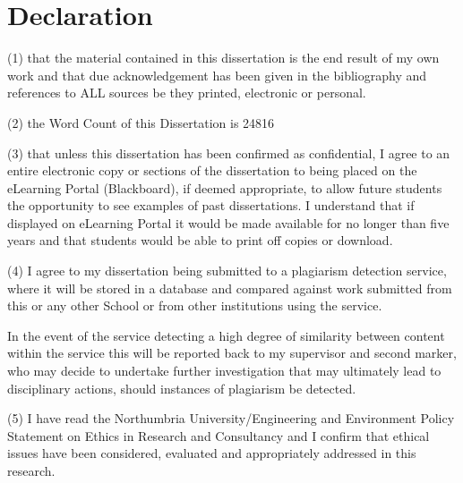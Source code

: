 \chapter{Declaration}
(1) that the material contained in this dissertation is the end result of my own work and that due acknowledgement has been given in the bibliography and references to ALL sources be they printed, electronic or personal.

(2) the Word Count of this Dissertation is 24816

(3) that unless this dissertation has been confirmed as confidential, I agree to an entire electronic copy or sections of the dissertation to being placed on the eLearning Portal (Blackboard), if deemed appropriate, to allow future students the opportunity to see examples of past dissertations.  I understand that if displayed on eLearning Portal it would be made available for no longer than five years and that students would be able to print off copies or download.  

(4) I agree to my dissertation being submitted to a plagiarism detection service, where it will be stored in a database and compared against work submitted from this or any other School or from other institutions using the service.  

In the event of the service detecting a high degree of similarity between content within the service this will be reported back to my supervisor and second marker, who may decide to undertake further investigation that may ultimately lead to disciplinary actions, should instances of plagiarism be detected.

(5) I have read the Northumbria University/Engineering and Environment Policy Statement on Ethics in Research and Consultancy and I confirm that ethical issues have been considered, evaluated and appropriately addressed in this research.
 

